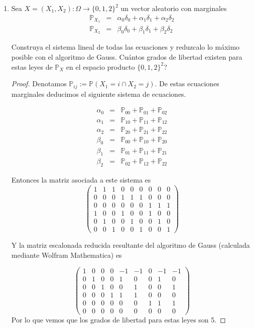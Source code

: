\documentclass[paper=letter, fontsize=11pt]{scrartcl} %
\numberwithin{equation}{section} %
\numberwithin{figure}{section} %
\numberwithin{table}{section} %
\newcommand{\prob}[1]{\mathbb{P}(#1)}
\newcommand{\pr}[1]{\mathbb{P}_{#1}}
\begin{document}
\begin{enumerate}[label = \arabic*)]
\item Sea $ X = (X_1,X_2):\Omega \to \{0,1,2\}^2 $ un vector aleatorio con marginales
\begin{eqnarray}
\mathbb{P}_{X_1}&=&\alpha_0\delta_0+\alpha_1\delta_1+\alpha_2\delta_2 \nonumber
\\\mathbb{P}_{X_2}&=&\beta_0\delta_0+\beta_1\delta_1+\beta_2\delta_2 \nonumber
\end{eqnarray}

Construya el sistema lineal de todas las ecuaciones y reduzcalo lo máximo posible con el algoritmo de Gauss. Cuántos grados de libertad existen para estas leyes de $ \mathbb{P}_X $ en el espacio producto $ \{0,1,2\}^2 $?
\begin{proof}
Denotamos $ \pr{ij}:=\prob{X_1=i \cap X_2 = j} $. De estas ecuaciones marginales deducimos el siguiente sistema de ecuaciones.

\begin{eqnarray}
\alpha_0 &=&\pr{00}+\pr{01}+\pr{02} \nonumber
\\\alpha_1 &=& \pr{10}+\pr{11}+\pr{12} \nonumber
\\\alpha_2 &=& \pr{20}+\pr{21}+\pr{22} \nonumber
\\\beta_0 &=& \pr{00}+\pr{10}+\pr{20} \nonumber
\\\beta_1 &=& \pr{01}+\pr{11}+\pr{21} \nonumber
\\\beta_2 &=& \pr{02}+\pr{12}+\pr{22} \nonumber
\end{eqnarray}

Entonces la matriz asociada a este sistema es
\begin{equation}
\begin{pmatrix}
1 & 1 & 1 & 0 & 0 & 0 & 0 & 0 & 0
\\0 & 0 & 0 & 1 & 1 & 1 & 0 & 0 & 0
\\0 & 0 & 0 & 0 & 0 & 0 & 1 & 1 & 1
\\1 & 0 & 0 & 1 & 0 & 0 & 1 & 0 & 0
\\0 & 1 & 0 & 0 & 1 & 0 & 0 & 1 & 0
\\0 & 0 & 1 & 0 & 0 & 1 & 0 & 0 & 1
\end{pmatrix} \nonumber
\end{equation}

Y la matriz escalonada reducida resultante del algoritmo de Gauss (calculada mediante Wolfram Mathematica) es

\begin{equation}
\begin{pmatrix}
 1 & 0 & 0 & 0 & -1 & -1 & 0 & -1 & -1 \\
 0 & 1 & 0 & 0 & 1 & 0 & 0 & 1 & 0 \\
 0 & 0 & 1 & 0 & 0 & 1 & 0 & 0 & 1 \\
 0 & 0 & 0 & 1 & 1 & 1 & 0 & 0 & 0 \\
 0 & 0 & 0 & 0 & 0 & 0 & 1 & 1 & 1 \\
 0 & 0 & 0 & 0 & 0 & 0 & 0 & 0 & 0
\end{pmatrix} \nonumber
\end{equation}
Por lo que vemos que los grados de libertad para estas leyes son 5.
\end{proof}


\end{enumerate}
\end{document}
